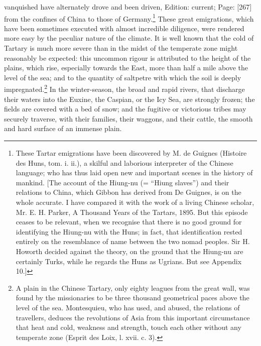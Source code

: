 vanquished have alternately drove and been driven, Edition: current; Page: [267] from the confines of China to those of Germany.\footnote{These Tartar emigrations have been discovered by M. de Guignes (Histoire des Huns, tom. i. ii.), a skilful and laborious interpreter of the Chinese language; who has thus laid open new and important scenes in the history of mankind. [The account of the Hiung-nu (= \texthebrew{“}Hiung slaves\texthebrew{}”) and their relations to China, which Gibbon has derived from De Guignes, is on the whole accurate. I have compared it with the work of a living Chinese scholar, Mr. E. H. Parker, A Thousand Years of the Tartars, 1895. But this episode ceases to be relevant, when we recognise that there is no good ground for identifying the Hiung-nu with the Huns; in fact, that identification rested entirely on the resemblance of name between the two nomad peoples. Sir H. Howorth decided against the theory, on the ground that the Hiung-nu are certainly Turks, while he regards the Huns as Ugrians. But see Appendix 10.]} These great emigrations, which have been sometimes executed with almost incredible diligence, were rendered more easy by the peculiar nature of the climate. It is well known that the cold of Tartary is much more severe than in the midst of the temperate zone might reasonably be expected: this uncommon rigour is attributed to the height of the plains, which rise, especially towards the East, more than half a mile above the level of the sea; and to the quantity of saltpetre with which the soil is deeply impregnated.\footnote{A plain in the Chinese Tartary, only eighty leagues from the great wall, was found by the missionaries to be three thousand geometrical paces above the level of the sea. Montesquieu, who has used, and abused, the relations of travellers, deduces the revolutions of Asia from this important circumstance that heat and cold, weakness and strength, touch each other without any temperate zone (Esprit des Loix, l. xvii. c. 3).} In the winter-season, the broad and rapid rivers, that discharge their waters into the Euxine, the Caspian, or the Icy Sea, are strongly frozen; the fields are covered with a bed of snow; and the fugitive or victorious tribes may securely traverse, with their families, their waggons, and their cattle, the smooth and hard surface of an immense plain.

